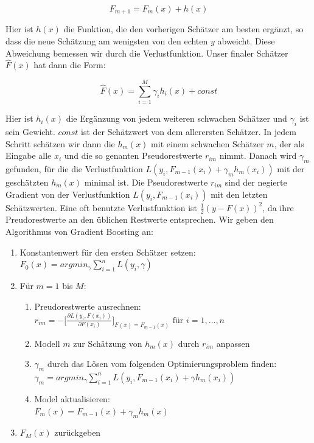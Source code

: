 \documentclass[12pt,a4paper,twoside]{scrartcl}
\numberwithin{equation}{section}
\begin{document}
\begin{equation}\label{eq:2.25}
	F_{m+1} = F_m(x) + h(x)
\end{equation} 

\noindent
Hier ist $h(x)$ die Funktion, die den vorherigen Schätzer am besten ergänzt, so dass die neue Schätzung am wenigsten von den echten $y$ abweicht. Diese Abweichung bemessen wir durch die Verlustfunktion. Unser finaler Schätzer $\hat F(x)$ hat dann die Form: \par 

\begin{equation}\label{eq:2.26}
	\hat F(x) = \sum_{i=1}^{M} \gamma_i h_i(x) + const
\end{equation} 

\noindent
Hier ist $h_i(x)$ die Ergänzung von jedem weiteren schwachen Schätzer und $\gamma_i$ ist sein Gewicht. $const$ ist der Schätzwert von dem allerersten Schätzer. In jedem Schritt schätzen wir dann die $h_m(x)$ mit einem schwachen Schätzer $m$, der als Eingabe alle $x_i$ und die so genanten Pseudorestwerte $r_{im}$ nimmt. Danach wird $\gamma_m$ gefunden, für die die Verlustfunktion $L(y_i,F_{m-1}(x_i)+\gamma_m h_m(x_i))$ mit der geschätzten $h_m(x)$ minimal ist. Die  Pseudorestwerte $r_{im}$ sind der negierte Gradient von der Verlustfunktion  $L(y_i,F_{m-1}(x_i))$ mit den letzten Schätzwerten. Eine oft benutzte Verlustfunktion ist $\frac{1}{2}(y-F(x))^2$, da ihre Preudorestwerte an den üblichen Restwerte entsprechen\cite{gradientBoost}. Wir geben den Algorithmus von Gradient Boosting an:\par 

\begin{enumerate}
\item Konstantenwert für den ersten Schätzer setzen:\\
$F_0(x) = argmin_{\gamma} \sum_{i=1}^n L(y_i,\gamma)$
\item Für $m = 1$ bis $M$:
\begin{enumerate}
\item Preudorestwerte ausrechnen:\\
$r_{im} = - \big [ \frac{\partial L(y_i,F(x_i))}{\partial F(x_i)}\big ]_{F(x)=F_{m-1}(x)} \text{ für } i= 1,\dots,n $
\item Modell $m$ zur Schätzung von $h_m(x)$ durch $r_{im}$ anpassen
\item $\gamma_m$ durch das Lösen vom folgenden Optimierungsproblem finden:\\
$\gamma_m = argmin_{\gamma} \sum_{i=1}^n L(y_i,F_{m-1}(x_i)+\gamma h_m(x_i))$
\item Model aktualisieren:\\
$F_m(x) = F_{m-1}(x) + \gamma_m h_m(x)$	
\end{enumerate}

\item $F_M(x)$ zurückgeben
\end{enumerate}
\end{document}
